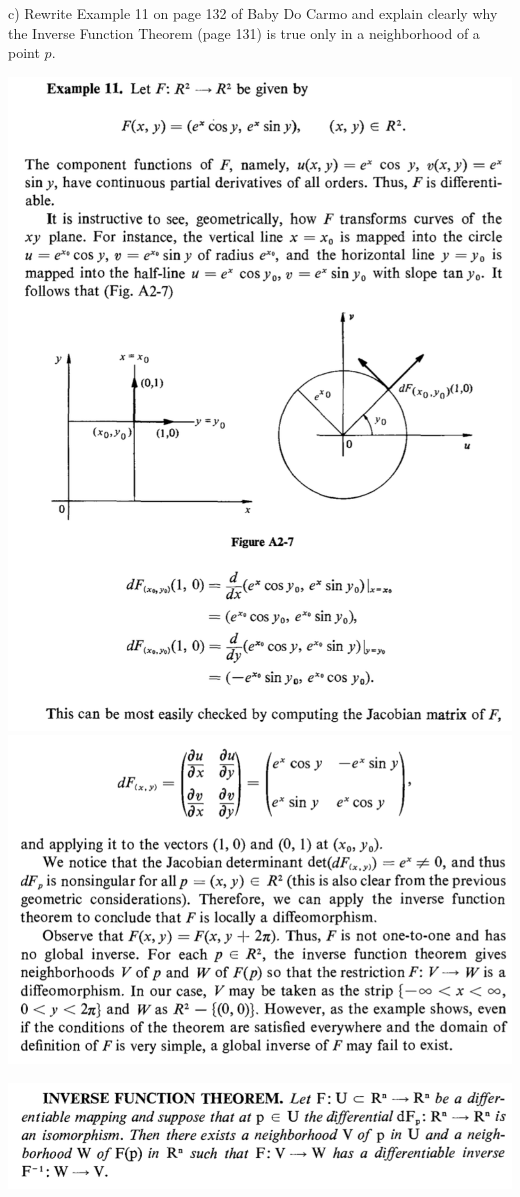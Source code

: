 \documentclass[10pt,letterpaper]{hmcpset}
\begin{document}
\newpage \begin{problem}
c) Rewrite Example 11 on page 132 of Baby Do Carmo and explain 
clearly why the Inverse Function Theorem (page 131) is true only in a neighborhood of a point $p$. 

\includegraphics[scale=0.7]{Ac1.png}
\includegraphics[scale=0.7]{Ac2.png}
\end{problem}
\begin{solution}
\includegraphics[scale=0.7]{Ac0.png}
\end{solution}
\end{document}
